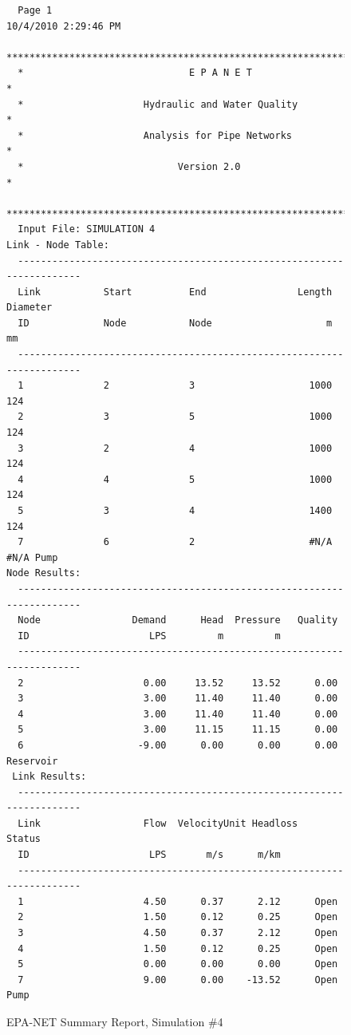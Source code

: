 \documentclass[11pt]{article}
\begin{document}
\begin{enumerate}
\begin{figure}[ht!] %
\centering

\begin{verbatim}
  Page 1                                            10/4/2010 2:29:46 PM
  **********************************************************************
  *                             E P A N E T                            *
  *                     Hydraulic and Water Quality                    *
  *                     Analysis for Pipe Networks                     *
  *                           Version 2.0                              *
  **********************************************************************
  Input File: SIMULATION 4
Link - Node Table:
  ----------------------------------------------------------------------
  Link           Start          End                Length  Diameter
  ID             Node           Node                    m        mm
  ----------------------------------------------------------------------
  1              2              3                    1000       124
  2              3              5                    1000       124
  3              2              4                    1000       124
  4              4              5                    1000       124
  5              3              4                    1400       124
  7              6              2                    #N/A      #N/A Pump
Node Results:
  ----------------------------------------------------------------------
  Node                Demand      Head  Pressure   Quality
  ID                     LPS         m         m          
  ----------------------------------------------------------------------
  2                     0.00     13.52     13.52      0.00
  3                     3.00     11.40     11.40      0.00
  4                     3.00     11.40     11.40      0.00
  5                     3.00     11.15     11.15      0.00
  6                    -9.00      0.00      0.00      0.00 Reservoir
 Link Results:
  ----------------------------------------------------------------------
  Link                  Flow  VelocityUnit Headloss    Status
  ID                     LPS       m/s      m/km
  ----------------------------------------------------------------------
  1                     4.50      0.37      2.12      Open
  2                     1.50      0.12      0.25      Open
  3                     4.50      0.37      2.12      Open
  4                     1.50      0.12      0.25      Open
  5                     0.00      0.00      0.00      Open
  7                     9.00      0.00    -13.52      Open Pump
  \end{verbatim}
     \caption{EPA-NET Summary Report, Simulation \#4}
   \label{fig:epanet4} 
\end{figure}
\clearpage


\end{enumerate}
\end{document}
